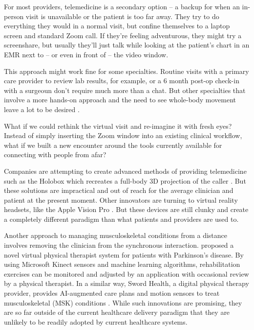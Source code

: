 \documentclass[utf8]{FrontiersinHarvard} %
\begin{document}
For most providers, telemedicine is a secondary option -- a backup for when an in-person visit is unavailable or the patient is too far away. They try to do everything they would in a normal visit, but confine themselves to a laptop screen and standard Zoom call. If they're feeling adventurous, they might try a screenshare, but usually they'll just talk while looking at the patient's chart in an EMR next to -- or even in front of -- the video window.

This approach might work fine for some specialties. Routine visits with a primary care provider to review lab results, for example, or a 6 month post-op check-in with a surgeoun don't require much more than a chat. But other specialties that involve a more hands-on approach and the need to see whole-body movement leave a lot to be desired \citep{bartonItsSecondBest2022}.

What if we could rethink the virtual visit and re-imagine it with fresh eyes? Instead of simply inserting the Zoom window into an existing clinical workflow, what if we built a new encounter around the tools currently available for connecting with people from afar?

Companies are attempting to create advanced methods of providing telemedicine such as the Holobox which recreates a full-body 3D projection of the caller \citep{TelehealthHolograms2023}. But these solutions are impractical and out of reach for the average clinician and patient at the present moment. Other innovators are turning to virtual reality headsets, like the Apple Vision Pro \citep{sissonApplesNewVision2024}. But these devices are still clunky and create a completely different paradigm than what patients and providers are used to.

Another approach to managing musculoskeletal conditions from a distance involves removing the clinician from the synchronous interaction. \citet{weiOnDemandVirtualPhysical2019} proposed a novel virtual physical therapist system for patients with Parkinson's disease. By using Microsoft Kinect sensors and machine learning algorithms, rehabilitation exercises can be monitored and adjusted by an application with occasional review by a physical therapist. In a similar way, Sword Health, a digital physical therapy provider, provides AI-augmented care plans and motion sensors to treat musculoskeletal (MSK) conditions \citep{herzlingerSwordHealth2022}. While such innovations are promising, they are so far outside of the current healthcare delivery paradigm that they are unlikely to be readily adopted by current healthcare systems.
\end{document}
